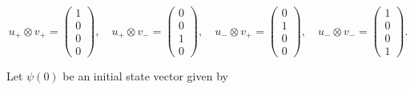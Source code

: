 \[

u_{+}\otimes v_{+}=\left( 

\begin{array}{c}

1 \\ 

0 \\ 

0 \\ 

0%

\end{array}%

\right), \quad  u_{+}\otimes v_{-}=\left( 

\begin{array}{c}

0 \\ 

0 \\ 

1 \\ 

0%

\end{array}%

\right),\quad u_{-}\otimes v_{+}=\left( 

\begin{array}{c}

0 \\ 

1 \\ 

0 \\ 

0%

\end{array}%

\right), \quad u_{-}\otimes v_{-}=\left( 

\begin{array}{c}

1 \\ 

0 \\ 

0 \\ 

1%

\end{array}%

\right) .

\]%

Let $\psi (0)$ be an initial state vector given by 

